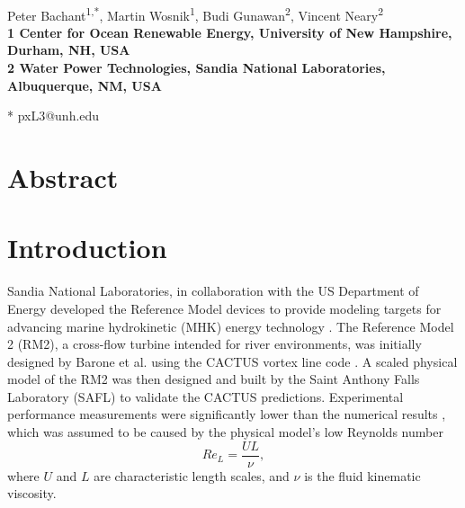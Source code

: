 \documentclass[10pt,letterpaper]{article}
\date{}
\begin{document}
\vspace*{0.35in}

\begin{flushleft}

{\Large \textbf{}}
\newline
\\
Peter Bachant\textsuperscript{1,*},
Martin Wosnik\textsuperscript{1},
Budi Gunawan\textsuperscript{2},
Vincent Neary\textsuperscript{2}
\\
\bigskip
\bf{1} Center for Ocean Renewable Energy, University of New Hampshire, Durham, NH, 
USA
\\
\bf{2} Water Power Technologies, Sandia National Laboratories, Albuquerque, NM, USA
\\
\bigskip

* pxL3@unh.edu

\end{flushleft}

\listoftodos

\section*{Abstract}



\linenumbers

\section*{Introduction} 

Sandia National Laboratories, in collaboration with the US Department of Energy
developed the Reference Model devices to provide modeling targets for advancing
marine hydrokinetic (MHK) energy technology \cite{Neary2014}. The Reference
Model 2 (RM2), a cross-flow turbine intended for river environments, was
initially designed by Barone et al. \cite{Barone2011} using the CACTUS vortex
line code \cite{Murray2011}. A scaled physical model of the RM2 was then
designed and built by the Saint Anthony Falls Laboratory (SAFL) to validate the
CACTUS predictions. Experimental performance measurements were significantly
lower than the numerical results \cite{Hill2014}, which was assumed to be caused
by the physical model's low Reynolds number
\begin{equation}
Re_L = \frac{UL}{\nu},
\label{eq:Re}
\end{equation}
where $U$ and $L$ are characteristic length scales, and $\nu$ is the fluid
kinematic viscosity.
\end{document}
